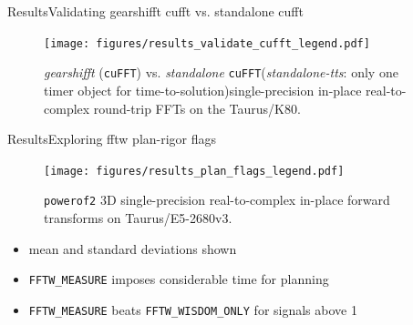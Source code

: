 \documentclass[t,11pt,hyperref={
  pdftitle = {gearshifft},
  pdfsubject = {gearshifft},
  pdfborder={0 0 0},
  colorlinks=true,
  urlcolor=red,
  citecolor=red,
  linkcolor=red,
  pdfauthor={Peter Steinbach, Matthias Werner}
  }
]{beamer}
\newcommand{\cufft}{\texttt{cuFFT}}
\newcommand{\mc}[1]{\texttt{\lstinline!#1!}}
\begin{document}
\begin{frame}{Results}{Validating gearshifft cufft vs. standalone cufft}
\begin{figure}[!htb]
  \centering
  \texttt{[image: figures/results\_validate\_cufft\_legend.pdf]}\\[-.5em]
  \hfill
  \caption{\textit{gearshifft} (\cufft{}) vs. \textit{standalone} \cufft{}\newline(\textit{standalone-tts}: only one timer object for time-to-solution)\newline single-precision in-place real-to-complex round-trip FFTs on the Taurus/K80.}
  \label{fig:verify_cufft}
\end{figure}
\end{frame}


\begin{frame}{Results}{Exploring fftw plan-rigor flags}
\begin{figure}[!htbp]\vspace{-1em}
  \centering
  \texttt{[image: figures/results\_plan\_flags\_legend.pdf]}\\[-.5em]
  \hfill
  \caption{\texttt{powerof2} 3D single-precision real-to-complex in-place forward transforms on Taurus/E5-2680v3.}
  \label{fig:fftw_plan_flags}
\end{figure}
\pause
\vspace{-1em}
\begin{itemize}
\item mean and standard deviations shown
\item \mc{FFTW_MEASURE} imposes considerable time for planning
\item \mc{FFTW_MEASURE} beats \mc{FFTW_WISDOM_ONLY} for signals above \SI{1}{\mebi\byte}
\end{itemize}
\end{frame}
\end{document}
